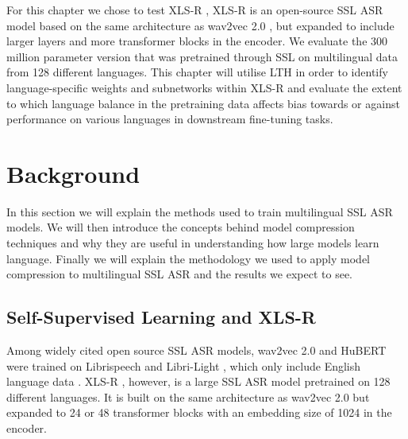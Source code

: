 For this chapter we chose to test XLS-R \cite{babu2021xlsr}, XLS-R is an open-source SSL ASR model based on the same architecture as wav2vec 2.0 \cite{wav2vec}, but expanded to include larger layers and more transformer blocks in the encoder. We evaluate the 300 million parameter version that was pretrained through SSL on multilingual data from 128 different languages. This chapter will utilise LTH in order to identify language-specific weights and subnetworks within XLS-R and evaluate the extent to which language balance in the pretraining data affects bias towards or against performance on various languages in downstream fine-tuning tasks.

\section{Background}\label{pru_sec:background}

In this section we will explain the methods used to train multilingual SSL ASR models. We will then introduce the concepts behind model compression techniques and why they are useful in understanding how large models learn language. Finally we will explain the methodology we used to apply model compression to multilingual SSL ASR and the results we expect to see.

\subsection{Self-Supervised Learning and XLS-R} \label{pru_ssec:SSL_and_XLSR}
Among widely cited open source SSL ASR models, wav2vec 2.0 and HuBERT were trained on Librispeech \cite{librispeech} and Libri-Light \cite{librilight}, which only include English language data \cite{wav2vec, hsu2021hubert}. XLS-R \cite{babu2021xlsr}, however, is a large SSL ASR model pretrained on 128 different languages. It is built on the same architecture as wav2vec 2.0 but expanded to 24 or 48 transformer blocks with an embedding size of 1024 in the encoder. 

